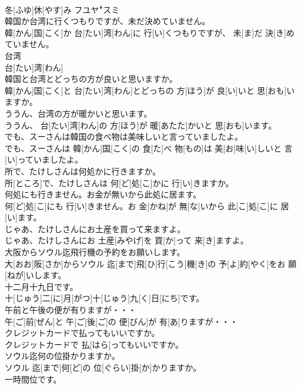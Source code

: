 \documentclass[8pt]{extreport}
\begin{document}
\begin{CJK}{UTF8}{min}
\\	冬[ふゆ]休[やす]み	フユヤꜜスミ
\\	韓国か台湾に行くつもりですが、未だ決めていません。	
\\	韓[かん]国[こく]か 台[たい]湾[わん]に 行[い]くつもりですが、 未[ま]だ 決[き]めていません。
\\	台湾	
\\	台[たい]湾[わん]	
\\	韓国と台湾とどっちの方が良いと思いますか。	
\\	韓[かん]国[こく]と 台[たい]湾[わん]とどっちの 方[ほう]が 良[い]いと 思[おも]いますか。
\\	ううん、台湾の方が暖かいと思います。	
\\	ううん、 台[たい]湾[わん]の 方[ほう]が 暖[あたた]かいと 思[おも]います。
\\	でも、スーさんは韓国の食べ物は美味しいと言っていましたよ。	
\\	でも、スーさんは 韓[かん]国[こく]の 食[た]べ 物[もの]は 美[お]味[い]しいと 言[い]っていましたよ。
\\	所で、たけしさんは何処かに行きますか。	
\\	所[ところ]で、たけしさんは 何[ど]処[こ]かに 行[い]きますか。
\\	何処にも行きません。お金が無いから此処に居ます。	
\\	何[ど]処[こ]にも 行[い]きません。お 金[かね]が 無[な]いから 此[こ]処[こ]に 居[い]ます。
\\	じゃあ、たけしさんにお土産を買って来ますよ。	
\\	じゃあ、たけしさんにお 土産[みやげ]を 買[か]って 来[き]ますよ。
\\	大阪からソウル迄飛行機の予約をお願いします。	
\\	大[おお]阪[さか]からソウル 迄[まで]飛[ひ]行[こう]機[き]の 予[よ]約[やく]をお 願[ねが]いします。
\\	十二月十九日です。	
\\	十[じゅう]二[に]月[がつ]十[じゅう]九[く]日[にち]です。
\\	午前と午後の便が有りますが・・・	
\\	午[ご]前[ぜん]と 午[ご]後[ご]の 便[びん]が 有[あ]りますが・・・
\\	クレジットカードで払ってもいいですか。	
\\	クレジットカードで 払[はら]ってもいいですか。
\\	ソウル迄何の位掛かりますか。	
\\	ソウル 迄[まで]何[ど]の 位[ぐらい]掛[か]かりますか。
\\	一時間位です。	

\end{CJK}
\end{document}
